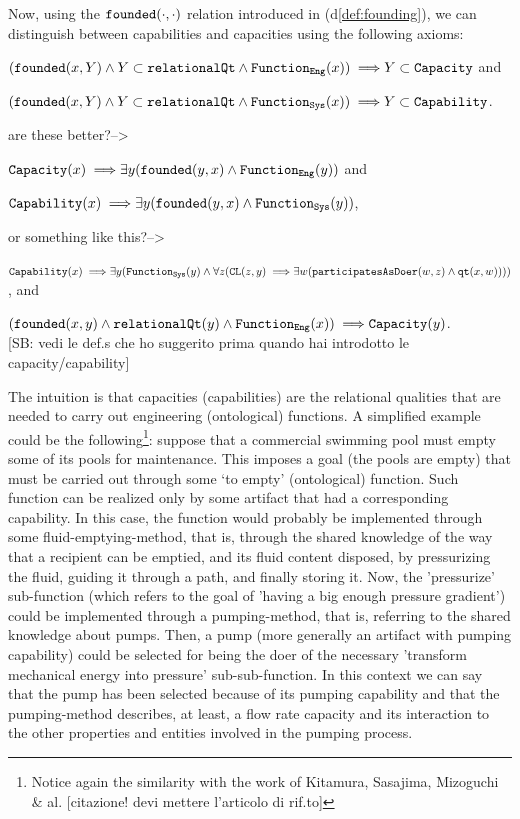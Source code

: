 \documentclass[sw]{iosart2x}
\newcommand{\bflist}{\begin{list}{}{\setlength{\topsep}{2mm}\setlength{\partopsep}{0mm}\setlength{\parsep}{0mm}\setlength{\leftmargin}{9mm}\setlength{\labelwidth}{8mm}}}
\newcommand{\eflist}{\end{list}}
\newcommand{\AxLabel}{\textrm{a}}
\newcommand{\DefLabel}{\textrm{d}}
\newcounter{cntax}
\newcommand{\myax}[1]{\refstepcounter{cntax}\begin{small}{\bf \AxLabel\thecntax\label{ax:#1}}\end{small}}
\newcommand{\refdf}[1]{({\DefLabel}\ref{#1})}
\newcommand{\generalStyle}[1]{\texttt{#1}}
\newcommand{\biRel}[3]{\generalStyle{#1}(#2,#3)}
\newcommand{\uniRel}[2]{\generalStyle{#1}(#2)}
\newcommand{\uniRelPar}[3]{\generalStyle{#1}_{\generalStyle{#3}}(#2)}
\newcommand{\myfi}{\hspace{0.9mm} \Longrightarrow}
\newcommand{\DOLCEQualityDirect}[2]{\biRel{qt}{#1}{#2}}
\newcommand{\DOLCECLby}[2]{\biRel{CL}{#1}{#2}}
\newcommand{\RelationalQualityClass}{\generalStyle{relationalQt}}
\newcommand{\CapabilityClass}{\generalStyle{Capability}}
\newcommand{\CapacityClass}{\generalStyle{Capacity}}
\newcommand{\Capability}[1]{\uniRel{Capability}{#1}}
\newcommand{\Capacity}[1]{\uniRel{Capacity}{#1}}
\newcommand{\RelationalQuality}[1]{\uniRel{relationalQt}{#1}}
\newcommand{\FunctionSys}[1]{\uniRelPar{Function}{#1}{Sys}}
\newcommand{\FunctionEng}[1]{\uniRelPar{Function}{#1}{Eng}}
\newcommand{\founded}[2]{\biRel{\foundedTerm{passive}}{#1}{#2}}
\newcommand{\participateAsDoer}[2]{\biRel{participatesAsDoer}{#1}{#2}}
\newcommand{\foundedTerm}[1]{%
  \ifthenelse{\equal{#1}{passive}}{founded}{%
    \ifthenelse{\equal{#1}{verb}}{found}{%
      \ifthenelse{\equal{#1}{gerund}}{founding}{%
        ERROR!%
      }%
    }%
  }%
}
\newcommand{\TODO}[1]{{\color{red} #1}}
\begin{document}
{Now, using the $\founded{\cdot}{\cdot}$ relation introduced in \refdf{def:founding}, we can distinguish between capabilities and capacities using the following axioms:
\bflist
  \item[\myax{capacityCostr}] $ (\founded{x}{Y} \land Y \subset \RelationalQualityClass \land \FunctionEng{x}) \myfi Y \subset \CapacityClass$ and
  \item[\myax{capabilityCostr}] $ (\founded{x}{Y} \land Y \subset \RelationalQualityClass \land \FunctionSys{x}) \myfi Y \subset \CapabilityClass$.
\eflist

\TODO{ are these better?-->
\bflist
  \item[\myax{capacityCostrBis}] $ \Capacity{x} \myfi \exists y (\founded{y}{x} \land \FunctionEng{y})$ and
  \item[\myax{capabilityCostrBis}] $ \Capability{x} \myfi \exists y (\founded{y}{x} \land \FunctionSys{y})$,
\eflist
}
\TODO{ or something like this?-->
\bflist
  \item[\myax{capabilityCostrTris}] $ \Capability{x} \myfi \exists y (\FunctionSys{y} \land \forall z(\DOLCECLby{z}{y} \myfi \exists w(\participateAsDoer{w}{z} \land \DOLCEQualityDirect{x}{w})))$, and
  \item[\myax{capacityCostrTris}] $ (\founded{x}{y} \land \RelationalQuality{y} \land \FunctionEng{x}) \myfi \Capacity{y}$. \\
\TODO{[SB: vedi le def.s che ho suggerito prima quando hai introdotto le capacity/capability]}
\eflist
}

The intuition is that capacities (capabilities) are the relational qualities that are needed to carry out engineering (ontological) functions.
A simplified example could be the following\footnote{Notice again the similarity with the work of Kitamura, Sasajima, Mizoguchi \& al.\TODO{[citazione! devi mettere l'articolo di rif.to]}}: suppose that a commercial swimming pool must empty some of its pools for maintenance. This imposes a goal (the pools are empty) that must be carried out through some `to empty' (ontological) function. Such function can be realized only by some artifact that had a corresponding capability. In this case, the function would probably be implemented through some fluid-emptying-method, that is, through the shared knowledge of the way that a recipient can be emptied, and its fluid content disposed, by pressurizing the fluid, guiding it through a path, and finally storing it.
Now, the 'pressurize' sub-function (which refers to the goal of 'having a big enough pressure gradient') could be implemented through a pumping-method, that is, referring to the shared knowledge about pumps.
Then, a pump (more generally an artifact with pumping capability) could be selected for being the doer of the necessary 'transform mechanical energy into pressure' sub-sub-function.
In this context we can say that the pump has been selected because of its pumping capability and that the pumping-method describes, at least, a flow rate capacity and its interaction to the other properties and entities involved in the pumping process. 
}
\end{document}
